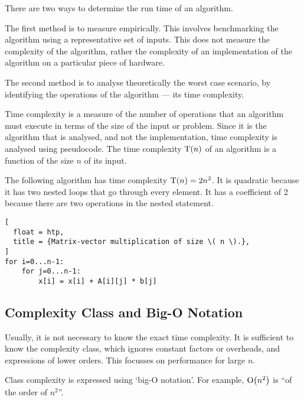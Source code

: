 There are two ways to determine the run time of an algorithm.

The first method is to measure empirically.
This involves benchmarking the algorithm using a representative set of inputs.
This does not measure the complexity of the algorithm, rather the complexity of an implementation of the algorithm on a particular piece of hardware.

The second method is to analyse theoretically the worst case scenario, by identifying the operations of the algorithm --- its time complexity.

Time complexity is a measure of the number of operations that an algorithm must execute in terms of the size of the input or problem.
Since it is the algorithm that is analysed, and not the implementation, time complexity is analysed using pseudocode.
The time complexity \( \textup{T}\!\left( n \right) \) of an algorithm is a function of the size \( n \) of its input.

The following algorithm has time complexity \( \textup{T}\!\left( n \right) = 2 n^2 \).
It is quadratic because it has two nested loops that go through every element.
It has a coefficient of \num{2} because there are two operations in the nested statement.

\begin{lstlisting}[
  float = htp,
  title = {Matrix-vector multiplication of size \( n \).},
]
for i=0...n-1:
    for j=0...n-1:
        x[i] = x[i] + A[i][j] * b[j]
\end{lstlisting}

\subsection{Complexity Class and Big-O Notation}

Usually, it is not necessary to know the exact time complexity.
It is sufficient to know the complexity class, which ignores constant factors or overheads, and expressions of lower orders.
This focusses on performance for large \( n \).

Class complexity is expressed using `big-O notation'.
For example, \( \textup{O}\!\left( n^2 \right) \) is ``of the order of \( n^2 \)''.

